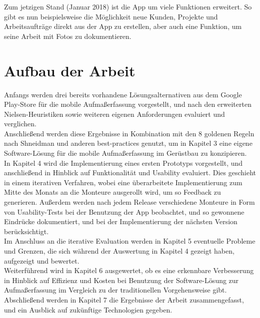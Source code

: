 Zum jetzigen Stand (Januar 2018) ist die App um viele Funktionen erweitert. So gibt es nun beispielsweise die Möglichkeit neue Kunden, Projekte und Arbeitsaufträge direkt aus der App zu erstellen, aber auch eine Funktion, um seine Arbeit mit Fotos zu dokumentieren. 

\section{Aufbau der Arbeit}
Anfangs werden drei bereits vorhandene Lösungsalternativen aus dem Google Play-Store für die mobile Aufmaßerfassung vorgestellt, und nach den erweiterten Nielsen-Heuristiken  sowie weiteren eigenen Anforderungen evaluiert und verglichen. \\

Anschließend werden diese Ergebnisse in Kombination mit den 8 goldenen Regeln nach Shneidman  und anderen best-practices  genutzt, um in Kapitel 3  eine eigene Software-Lösung für die mobile Aufmaßerfassung im Gerüstbau zu konzipieren. \\

In Kapitel 4  wird die Implementierung eines ersten Prototyps vorgestellt, und anschließend in Hinblick auf Funktionalität und Usability evaluiert. Dies geschieht in einem iterativen Verfahren, wobei eine überarbeitete Implementierung zum Mitte des Monats an die Monteure ausgerollt wird, um so Feedback zu generieren. Außerdem werden nach jedem Release verschiedene Monteure in Form von Usability-Tests bei der Benutzung der App beobachtet, und so gewonnene Eindrücke dokumentiert, und bei der Implementierung der nächsten Version berücksichtigt.  \\

Im Anschluss an die iterative Evaluation werden in Kapitel 5 eventuelle Probleme und Grenzen, die sich während der Auswertung in Kapitel 4 gezeigt haben, aufgezeigt und bewertet. \\

Weiterführend wird in Kapitel 6 ausgewertet, ob es eine erkennbare Verbesserung in Hinblick auf Effizienz und Kosten bei Benutzung der Software-Lösung zur Aufmaßerfassung im Vergleich zu der traditionellen Vorgehensweise gibt. \\

Abschließend werden in Kapitel 7 die Ergebnisse der Arbeit zusammengefasst, und ein Ausblick auf zukünftige Technologien gegeben. 

